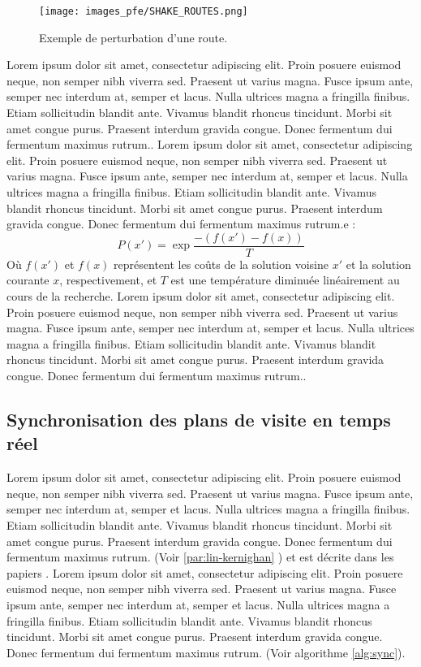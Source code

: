 \medskip

\begin{figure}[hbt!]
  \centering
  \texttt{[image: images\_pfe/SHAKE\_ROUTES.png]}
  \caption{Exemple de perturbation d'une route.}
  \label{fig:shake-route}
\end{figure}
\FloatBarrier

\medskip
Lorem ipsum dolor sit amet, consectetur adipiscing elit. Proin posuere euismod neque, non semper nibh viverra sed. Praesent ut varius magna. Fusce ipsum ante, semper nec interdum at, semper et lacus. Nulla ultrices magna a fringilla finibus. Etiam sollicitudin blandit ante. Vivamus blandit rhoncus tincidunt. Morbi sit amet congue purus. Praesent interdum gravida congue. Donec fermentum dui fermentum maximus rutrum.\parencite{hemmelmayr_variable_2009}. Lorem ipsum dolor sit amet, consectetur adipiscing elit. Proin posuere euismod neque, non semper nibh viverra sed. Praesent ut varius magna. Fusce ipsum ante, semper nec interdum at, semper et lacus. Nulla ultrices magna a fringilla finibus. Etiam sollicitudin blandit ante. Vivamus blandit rhoncus tincidunt. Morbi sit amet congue purus. Praesent interdum gravida congue. Donec fermentum dui fermentum maximus rutrum.e :
\begin{equation*}
  P(x') = \exp{\frac{-(f(x')-f(x))}{T}}
\end{equation*}
Où $f(x')$ et $f(x)$ représentent les coûts de la solution voisine $x'$ et la solution courante $x$, respectivement, et $T$ est une température diminuée linéairement au cours de la recherche. Lorem ipsum dolor sit amet, consectetur adipiscing elit. Proin posuere euismod neque, non semper nibh viverra sed. Praesent ut varius magna. Fusce ipsum ante, semper nec interdum at, semper et lacus. Nulla ultrices magna a fringilla finibus. Etiam sollicitudin blandit ante. Vivamus blandit rhoncus tincidunt. Morbi sit amet congue purus. Praesent interdum gravida congue. Donec fermentum dui fermentum maximus rutrum..

\subsection{Synchronisation des plans de visite en temps réel}

Lorem ipsum dolor sit amet, consectetur adipiscing elit. Proin posuere euismod neque, non semper nibh viverra sed. Praesent ut varius magna. Fusce ipsum ante, semper nec interdum at, semper et lacus. Nulla ultrices magna a fringilla finibus. Etiam sollicitudin blandit ante. Vivamus blandit rhoncus tincidunt. Morbi sit amet congue purus. Praesent interdum gravida congue. Donec fermentum dui fermentum maximus rutrum. (Voir \ref{par:lin-kernighan} ) et est décrite dans les papiers \parencite{helsgaun_effective_2000,helsgaun_general_2009}. Lorem ipsum dolor sit amet, consectetur adipiscing elit. Proin posuere euismod neque, non semper nibh viverra sed. Praesent ut varius magna. Fusce ipsum ante, semper nec interdum at, semper et lacus. Nulla ultrices magna a fringilla finibus. Etiam sollicitudin blandit ante. Vivamus blandit rhoncus tincidunt. Morbi sit amet congue purus. Praesent interdum gravida congue. Donec fermentum dui fermentum maximus rutrum. (Voir algorithme \ref{alg:sync}).

